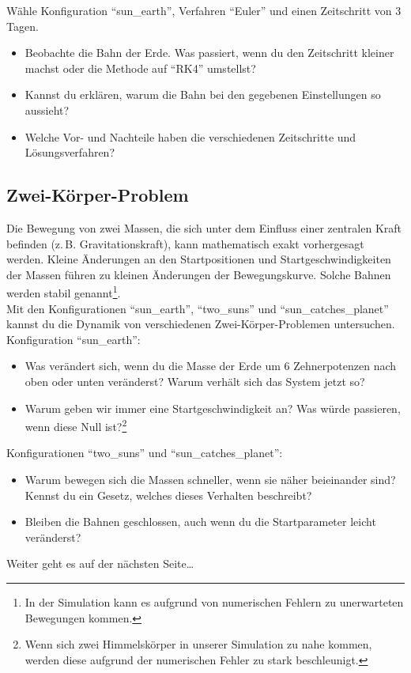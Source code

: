 \documentclass{scrartcl}
\begin{document}
        \noindent	Wähle Konfiguration "`sun\_earth"', Verfahren "`Euler"' und einen Zeitschritt von $3$ Tagen.
            \begin{itemize}
                \item Beobachte die Bahn der Erde. Was passiert, wenn du den Zeitschritt kleiner machst oder die Methode auf "`RK4"' umstellst? 
                \item Kannst du erklären, warum die Bahn bei den gegebenen Einstellungen so aussieht?
                \item Welche Vor- und Nachteile haben die verschiedenen Zeitschritte und Lösungsverfahren?
            \end{itemize}
        \subsection*{Zwei-Körper-Problem}
        Die Bewegung von zwei Massen, die sich unter dem Einfluss einer zentralen Kraft befinden (z.\,B. Gravitationskraft), kann mathematisch exakt vorhergesagt werden.
        Kleine Änderungen an den Startpositionen und Startgeschwindigkeiten der Massen führen zu kleinen Änderungen der Bewegungskurve.
        Solche Bahnen werden stabil genannt\footnote{In der Simulation kann es aufgrund von numerischen Fehlern zu unerwarteten Bewegungen kommen.}.\\

        \noindent Mit den Konfigurationen "`sun\_earth"', "`two\_suns"' und "`sun\_catches\_planet"' kannst du die Dynamik von verschiedenen Zwei-Körper-Problemen untersuchen.\\
        Konfiguration "`sun\_earth"':
        \begin{itemize}
            \item Was verändert sich, wenn du die Masse der Erde um 6 Zehnerpotenzen nach oben oder unten veränderst? Warum verhält sich das System jetzt so?
            \item Warum geben wir immer eine Startgeschwindigkeit an? Was würde passieren, wenn diese Null ist?\footnote{Wenn sich zwei Himmelskörper in unserer Simulation zu nahe kommen, werden diese aufgrund der numerischen Fehler zu stark beschleunigt.}
        \end{itemize}
        Konfigurationen "`two\_suns"' und "`sun\_catches\_planet"':
        \begin{itemize}
            \item Warum bewegen sich die Massen schneller, wenn sie näher beieinander sind?
            Kennst du ein Gesetz, welches dieses Verhalten beschreibt?
            \item Bleiben die Bahnen geschlossen, auch wenn du die Startparameter leicht veränderst?
        \end{itemize}
        \vfill\hfill
        Weiter geht es auf der nächsten Seite\dots\\[1cm]
        \phantom{A}
        \newpage
\end{document}

